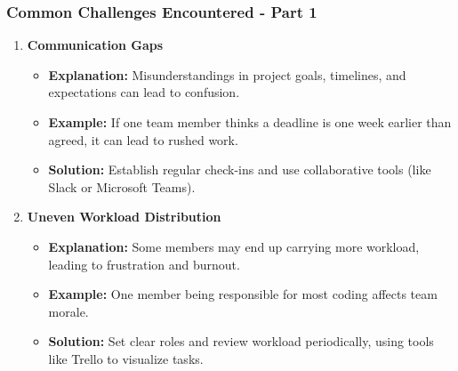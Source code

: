 \documentclass[aspectratio=169]{beamer}
\begin{document}
\begin{frame}[fragile]
    \frametitle{Common Challenges Encountered - Part 1}
    \begin{enumerate}
        \item \textbf{Communication Gaps}
            \begin{itemize}
                \item \textbf{Explanation:} Misunderstandings in project goals, timelines, and expectations can lead to confusion.
                \item \textbf{Example:} If one team member thinks a deadline is one week earlier than agreed, it can lead to rushed work.
                \item \textbf{Solution:} Establish regular check-ins and use collaborative tools (like Slack or Microsoft Teams).
            \end{itemize}
        
        \item \textbf{Uneven Workload Distribution}
            \begin{itemize}
                \item \textbf{Explanation:} Some members may end up carrying more workload, leading to frustration and burnout.
                \item \textbf{Example:} One member being responsible for most coding affects team morale.
                \item \textbf{Solution:} Set clear roles and review workload periodically, using tools like Trello to visualize tasks.
            \end{itemize}
    \end{enumerate}
\end{frame}
\end{document}
